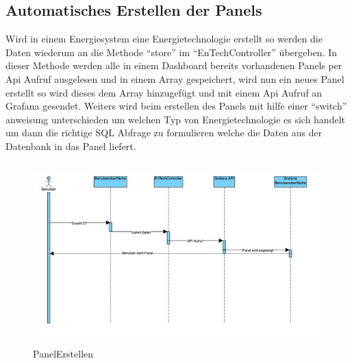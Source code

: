 \subsection{Automatisches Erstellen der Panels}
Wird in einem Energiesystem eine Energietechnologie erstellt so werden die Daten wiederum an die Methode “store” im “EnTechController” übergeben. In dieser Methode werden alle in einem Dashboard bereits vorhandenen Panels per Api Aufruf ausgelesen und in einem Array gespeichert, wird nun ein neues Panel erstellt so wird dieses dem Array hinzugefügt und mit einem Api  Aufruf an Grafana gesendet. Weiters wird beim erstellen des Panels mit hilfe einer “switch” anweisung unterschieden um welchen Typ von Energietechnologie es sich handelt um dann die richtige SQL Abfrage zu formulieren welche die Daten aus der Datenbank in das Panel liefert. 
\begin{figure}[h]
	\centering
	\includegraphics[height=7cm,width=14cm]{images/PanelErstellen}
	\caption{PanelErstellen}
	\label{fig:PanelErstellen }
\end{figure} 


